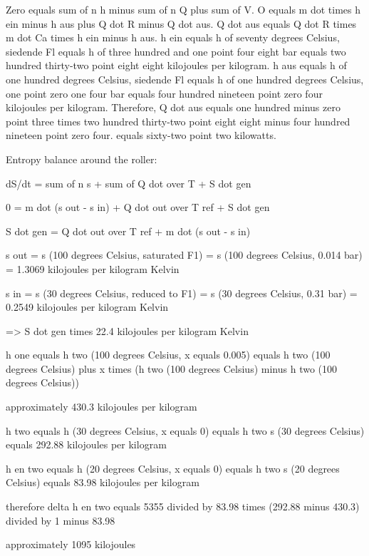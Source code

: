 Zero equals sum of n h minus sum of n Q plus sum of V.  
O equals m dot times h ein minus h aus plus Q dot R minus Q dot aus.  
Q dot aus equals Q dot R times m dot Ca times h ein minus h aus.  
h ein equals h of seventy degrees Celsius, siedende Fl equals h of three hundred and one point four eight bar equals two hundred thirty-two point eight eight kilojoules per kilogram.  
h aus equals h of one hundred degrees Celsius, siedende Fl equals h of one hundred degrees Celsius, one point zero one four bar equals four hundred nineteen point zero four kilojoules per kilogram.  
Therefore, Q dot aus equals one hundred minus zero point three times two hundred thirty-two point eight eight minus four hundred nineteen point zero four.  
equals sixty-two point two kilowatts.

Entropy balance around the roller:

dS/dt = sum of n s + sum of Q dot over T + S dot gen

0 = m dot (s out - s in) + Q dot out over T ref + S dot gen

S dot gen = Q dot out over T ref + m dot (s out - s in)

s out = s (100 degrees Celsius, saturated F1) = s (100 degrees Celsius, 0.014 bar) = 1.3069 kilojoules per kilogram Kelvin

s in = s (30 degrees Celsius, reduced to F1) = s (30 degrees Celsius, 0.31 bar) = 0.2549 kilojoules per kilogram Kelvin

=> S dot gen times 22.4 kilojoules per kilogram Kelvin

h one equals h two (100 degrees Celsius, x equals 0.005) equals h two (100 degrees Celsius) plus x times (h two (100 degrees Celsius) minus h two (100 degrees Celsius))  

approximately 430.3 kilojoules per kilogram  

h two equals h (30 degrees Celsius, x equals 0) equals h two s (30 degrees Celsius) equals 292.88 kilojoules per kilogram  

h en two equals h (20 degrees Celsius, x equals 0) equals h two s (20 degrees Celsius) equals 83.98 kilojoules per kilogram  

therefore delta h en two equals 5355 divided by 83.98 times (292.88 minus 430.3) divided by 1 minus 83.98  

approximately 1095 kilojoules
